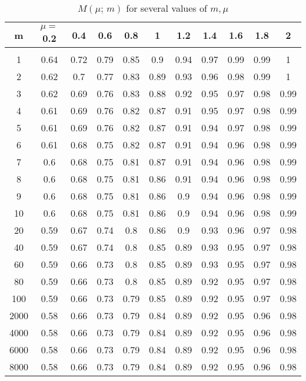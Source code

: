 \documentclass[amsmath,amssymb,floatfix]{revtex4}
\numberwithin{equation}{section}
\begin{document}
\begin{table}[htb]
\caption{\label{tab:table1} $M(\mu ; \, m)$ for several values of $m, \mu$ }
\begin{ruledtabular}
\begin{tabular}{ccccccccccc}
m & $\mu = $0.2 & 0.4 & 0.6 & 0.8 & 1 & 1.2 & 1.4 & 1.6 & 1.8 & 2 \\
\hline
\vspace{-5pt}
\\
1 & 0.64 & 0.72 & 0.79 & 0.85 & 0.9 & 0.94 & 0.97 & 0.99 & 0.99 & 1 \\
2 & 0.62 & 0.7 & 0.77 & 0.83 & 0.89 & 0.93 & 0.96 & 0.98 & 0.99 & 1 \\
3 & 0.62 & 0.69 & 0.76 & 0.83 & 0.88 & 0.92 & 0.95 & 0.97 & 0.98 & 0.99 \\
4 & 0.61 & 0.69 & 0.76 & 0.82 & 0.87 & 0.91 & 0.95 & 0.97 & 0.98 & 0.99 \\
5 & 0.61 & 0.69 & 0.76 & 0.82 & 0.87 & 0.91 & 0.94 & 0.97 & 0.98 & 0.99 \\
6 & 0.61 & 0.68 & 0.75 & 0.82 & 0.87 & 0.91 & 0.94 & 0.96 & 0.98 & 0.99 \\
7 & 0.6 & 0.68 & 0.75 & 0.81 & 0.87 & 0.91 & 0.94 & 0.96 & 0.98 & 0.99 \\
8 & 0.6 & 0.68 & 0.75 & 0.81 & 0.86 & 0.91 & 0.94 & 0.96 & 0.98 & 0.99 \\
9 & 0.6 & 0.68 & 0.75 & 0.81 & 0.86 & 0.9 & 0.94 & 0.96 & 0.98 & 0.99 \\
10 & 0.6 & 0.68 & 0.75 & 0.81 & 0.86 & 0.9 & 0.94 & 0.96 & 0.98 & 0.99 \\
20 & 0.59 & 0.67 & 0.74 & 0.8 & 0.86 & 0.9 & 0.93 & 0.96 & 0.97 & 0.98 \\
40 & 0.59 & 0.67 & 0.74 & 0.8 & 0.85 & 0.89 & 0.93 & 0.95 & 0.97 & 0.98 \\
60 & 0.59 & 0.66 & 0.73 & 0.8 & 0.85 & 0.89 & 0.93 & 0.95 & 0.97 & 0.98 \\
80 & 0.59 & 0.66 & 0.73 & 0.8 & 0.85 & 0.89 & 0.92 & 0.95 & 0.97 & 0.98 \\
100 & 0.59 & 0.66 & 0.73 & 0.79 & 0.85 & 0.89 & 0.92 & 0.95 & 0.97 & 0.98 \\
2000 & 0.58 & 0.66 & 0.73 & 0.79 & 0.84 & 0.89 & 0.92 & 0.95 & 0.96 & 0.98 \\
4000 & 0.58 & 0.66 & 0.73 & 0.79 & 0.84 & 0.89 & 0.92 & 0.95 & 0.96 & 0.98 \\
6000 & 0.58 & 0.66 & 0.73 & 0.79 & 0.84 & 0.89 & 0.92 & 0.95 & 0.96 & 0.98 \\
8000 & 0.58 & 0.66 & 0.73 & 0.79 & 0.84 & 0.89 & 0.92 & 0.95 & 0.96 & 0.98 \\

\end{tabular}
\end{ruledtabular}
\end{table}
\end{document}
